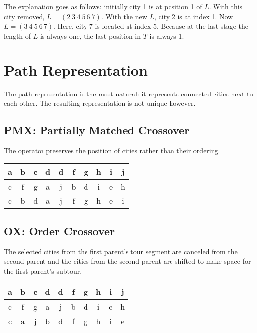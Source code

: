 \documentclass[../main.tex]{subfiles}
\begin{document}
The explanation goes as follows: initially city 1 is at position 1 of $L$. With this city removed, $L = (2 ~ 3 ~ 4 ~ 5 ~ 6 ~ 7)$. With the new $L$, city 2 is at index 1. Now $L = (3 ~ 4 ~ 5 ~ 6 ~ 7)$. Here, city 7 is located at index 5. Because at the last stage the length of $L$ is always one, the last position in $T$ is always 1.

\section{Path Representation}

The path representation is the most natural: it represents connected cities next to each other. The resulting representation is not unique however.

\subsection{PMX: Partially Matched Crossover}
The operator preserves the position of cities rather than their ordering.
\begin{table}[H]
    \centering
    \begin{tabular}{|c|c|c|c|c|c|c|c|c|c|}
        \hline
        a & b & c & d & d &\cellcolor{black!15}f & \cellcolor{black!15}g & \cellcolor{black!15}h & i & j \\ \hline
        c & f & g & a & j &\cellcolor{black!25}b & \cellcolor{black!25}d & \cellcolor{black!25}i & e & h \\ \hline
      \hline
        c & \cellcolor{black!25}b & \cellcolor{black!25}d & a & j &\cellcolor{black!15}f & \cellcolor{black!15}g & \cellcolor{black!15}h & e & \cellcolor{black!25}i \\ \hline
    \end{tabular}
\end{table}

\subsection{OX: Order Crossover}
The selected cities from the first parent's tour segment are canceled from the second parent and the cities from the second parent are shifted to make space for the first parent's subtour.
\begin{table}[H]
    \centering
    \begin{tabular}{|c|c|c|c|c|c|c|c|c|c|}
        \hline
        a & b & c & d & d &\cellcolor{black!15}f & \cellcolor{black!15}g & \cellcolor{black!15}h & i & j \\ \hline
        c &\cellcolor{black!5}f &\cellcolor{black!5}g & a & j & b & d & i & e & \cellcolor{black!5}h \\ \hline
      \hline
        c & a & j & b & d &\cellcolor{black!15}f & \cellcolor{black!15}g & \cellcolor{black!15}h & i & e \\ \hline
    \end{tabular}
\end{table}
\end{document}
